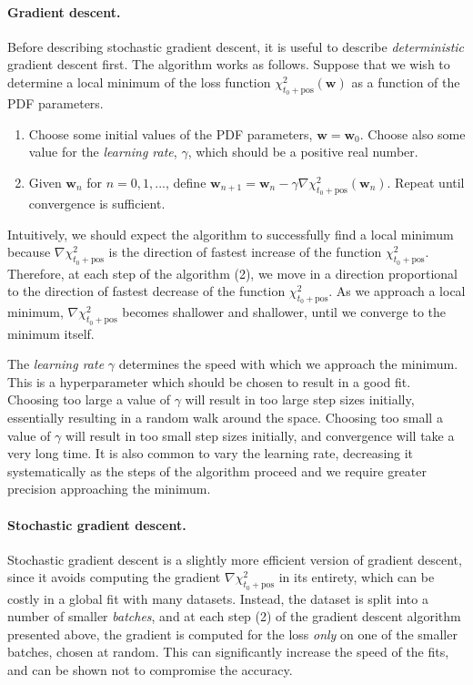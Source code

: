 \documentclass[withindex,glossary]{cam-thesis}
\renewcommand{\vec}[1]{\textbf{#1}} %
\begin{document}
\paragraph{Gradient descent.} Before describing stochastic gradient descent, it is useful to describe \textit{deterministic} gradient descent first. The algorithm works as follows. Suppose that we wish to determine a local minimum of the loss function $\chi^2_{t_0+\text{pos}}(\vec{w})$ as a function of the PDF parameters. 

\begin{enumerate}[label = (\arabic*)]
\item Choose some initial values of the PDF parameters, $\vec{w} = \vec{w}_0$. Choose also some value for the \textit{learning rate}, $\gamma$, which should be a positive real number.
\item Given $\vec{w}_n$ for $n=0,1,...$, define $\vec{w}_{n+1} = \vec{w}_n - \gamma \nabla \chi^2_{t_0+\text{pos}}(\vec{w}_n)$. Repeat until convergence is sufficient.
\end{enumerate}

Intuitively, we should expect the algorithm to successfully find a local minimum because $\nabla \chi^2_{t_0+\text{pos}}$ is the direction of fastest increase of the function $\chi^2_{t_0+\text{pos}}$. Therefore, at each step of the algorithm (2), we move in a direction proportional to the direction of fastest decrease of the function $\chi^2_{t_0+\text{pos}}$. As we approach a local minimum, $\nabla \chi^2_{t_0+\text{pos}}$ becomes shallower and shallower, until we converge to the minimum itself.

The \textit{learning rate} $\gamma$ determines the speed with which we approach the minimum. This is a hyperparameter which should be chosen to result in a good fit. Choosing too large a value of $\gamma$ will result in too large step sizes initially, essentially resulting in a random walk around the space. Choosing too small a value of $\gamma$ will result in too small step sizes initially, and convergence will take a very long time. It is also common to vary the learning rate, decreasing it systematically as the steps of the algorithm proceed and we require greater precision approaching the minimum.

\paragraph{Stochastic gradient descent.} Stochastic gradient descent is a slightly more efficient version of gradient descent, since it avoids computing the gradient $\nabla \chi^2_{t_0+\text{pos}}$ in its entirety, which can be costly in a global fit with many datasets. Instead, the dataset is split into a number of smaller \textit{batches}, and at each step (2) of the gradient descent algorithm presented above, the gradient is computed for the loss \textit{only} on one of the smaller batches, chosen at random. This can significantly increase the speed of the fits, and can be shown not to compromise the accuracy. 
\end{document}
